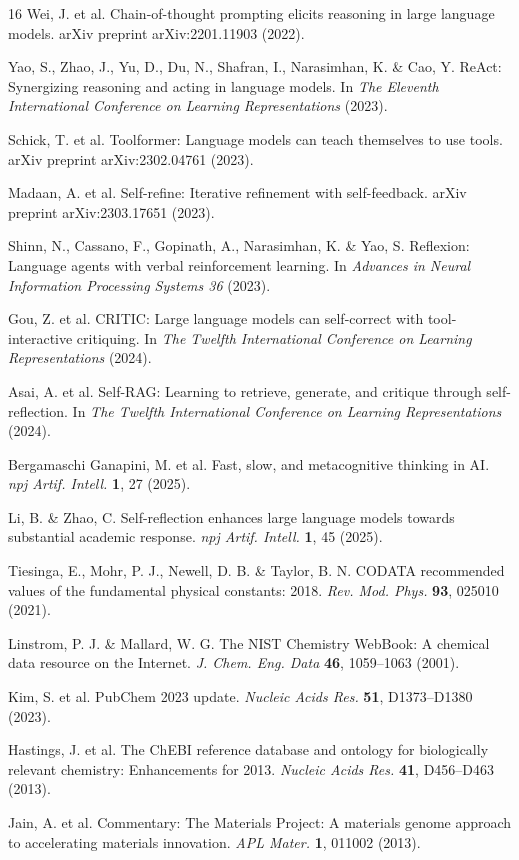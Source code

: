 \documentclass[12pt]{article}
\begin{document}
\begin{thebibliography}{16}
Wei, J. et al. Chain-of-thought prompting elicits reasoning in large language models. arXiv preprint arXiv:2201.11903 (2022).

Yao, S., Zhao, J., Yu, D., Du, N., Shafran, I., Narasimhan, K. \& Cao, Y. ReAct: Synergizing reasoning and acting in language models. In \textit{The Eleventh International Conference on Learning Representations} (2023).

Schick, T. et al. Toolformer: Language models can teach themselves to use tools. arXiv preprint arXiv:2302.04761 (2023).

Madaan, A. et al. Self-refine: Iterative refinement with self-feedback. arXiv preprint arXiv:2303.17651 (2023).

Shinn, N., Cassano, F., Gopinath, A., Narasimhan, K. \& Yao, S. Reflexion: Language agents with verbal reinforcement learning. In \textit{Advances in Neural Information Processing Systems 36} (2023).

Gou, Z. et al. CRITIC: Large language models can self-correct with tool-interactive critiquing. In \textit{The Twelfth International Conference on Learning Representations} (2024).

Asai, A. et al. Self-RAG: Learning to retrieve, generate, and critique through self-reflection. In \textit{The Twelfth International Conference on Learning Representations} (2024).

Bergamaschi Ganapini, M. et al. Fast, slow, and metacognitive thinking in AI. \textit{npj Artif. Intell.} \textbf{1}, 27 (2025).

Li, B. \& Zhao, C. Self-reflection enhances large language models towards substantial academic response. \textit{npj Artif. Intell.} \textbf{1}, 45 (2025).

Tiesinga, E., Mohr, P. J., Newell, D. B. \& Taylor, B. N. CODATA recommended values of the fundamental physical constants: 2018. \textit{Rev. Mod. Phys.} \textbf{93}, 025010 (2021).

Linstrom, P. J. \& Mallard, W. G. The NIST Chemistry WebBook: A chemical data resource on the Internet. \textit{J. Chem. Eng. Data} \textbf{46}, 1059--1063 (2001).

Kim, S. et al. PubChem 2023 update. \textit{Nucleic Acids Res.} \textbf{51}, D1373--D1380 (2023).

Hastings, J. et al. The ChEBI reference database and ontology for biologically relevant chemistry: Enhancements for 2013. \textit{Nucleic Acids Res.} \textbf{41}, D456--D463 (2013).

Jain, A. et al. Commentary: The Materials Project: A materials genome approach to accelerating materials innovation. \textit{APL Mater.} \textbf{1}, 011002 (2013).
\end{thebibliography}
\end{document}
